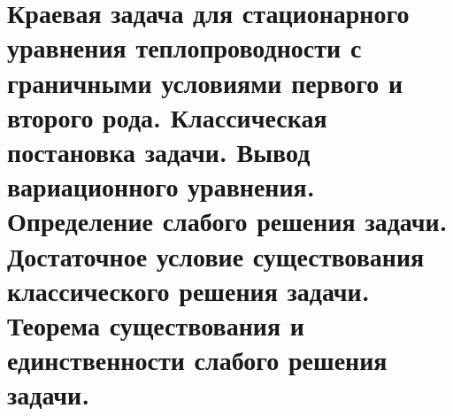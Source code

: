 \documentclass[__main__.tex]{subfiles}
\begin{document}
\section{Краевая задача для стационарного уравнения теплопроводности с граничными условиями первого и второго рода. Классическая постановка задачи. Вывод вариационного уравнения. Определение слабого решения задачи. Достаточное условие существования классического решения задачи. Теорема существования и единственности слабого решения задачи.}
\end{document}
